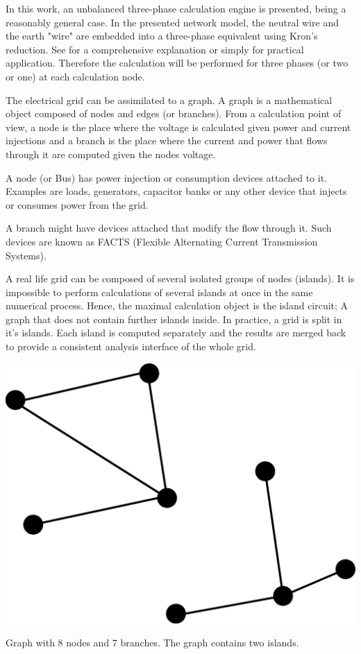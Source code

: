 \documentclass[nols,a4paper,twoside,notoc,fleqn]{tufte-book}
\begin{document}
In this work, an unbalanced three-phase calculation engine is presented, being a reasonably general case. In the presented network model, the neutral wire and the earth "wire" are embedded into a three-phase equivalent using Kron's reduction. See \cite{dorfler2013kron} for a comprehensive explanation or simply \cite{kersting2012distribution} for practical application. Therefore the calculation will be performed for three phases (or two or one) at each calculation node.

The electrical grid can be assimilated to a graph. A graph is a mathematical object composed of nodes and edges (or branches). From a calculation point of view, a node is the place where the voltage is calculated given power and current injections and a branch is the place where the current and power that flows through it are computed given the nodes voltage.

A node (or Bus) has power injection or consumption devices attached to it. Examples are loads, generators, capacitor banks or any other device that injects or consumes power from the grid.

A branch might have devices attached that modify the flow through it. Such devices are known as FACTS (Flexible Alternating Current Transmission Systems). 

A real life grid can be composed of several isolated groups of nodes (islands). It is impossible to perform calculations of several islands at once in the same numerical process. Hence, the maximal calculation object is the island circuit; A graph that does not contain further islands inside. In practice, a grid is split in it's islands. Each island is computed separately and the results are merged back to provide a consistent analysis interface of the whole grid.

\begin{marginfigure}
  \includegraphics[width=\linewidth]{img/simple_two_island_graph.eps}
  \caption{Graph with 8 nodes and 7 branches. The graph contains two islands.}
  \label{fig:simple_two_island_graph}
\end{marginfigure}
\end{document}
